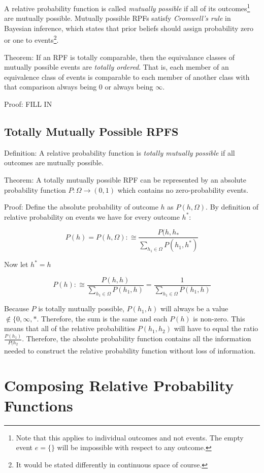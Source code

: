 \documentclass[twoside]{article}
\theoremstyle{plain}%
\theoremstyle{definition}
\theoremstyle{remark}
\begin{document}
A relative probability function is called \textit{mutually possible} if all of its outcomes\footnote{Note that this applies to individual outcomes and not events. The empty event \(e = \{\}\) will be impossible with respect to any outcome.} are mutually possible. Mutually possible RPFs satisfy \textit{Cromwell's rule} in Bayesian inference, which states that prior beliefs should assign probability zero or one to events\footnote{It would be stated differently in continuous space of course.}.

Theorem: If an RPF is totally comparable, then the equivalance classes of mutually possible events are \textit{totally ordered}. That is, each member of an equivalence class of events is comparable to each member of another class with that comparison always being 0 or always being \(\infty\).

Proof: FILL IN

\subsection{Totally Mutually Possible RPFS}

Definition: A relative probability function is \textit{totally mutually possible} if all outcomes are mutually possible.

Theorem: A totally mutually possible RPF can be represented by an absolute probability function \(P: \Omega \rightarrow (0, 1)\) which contains no zero-probability events.

Proof: Define the absolute probability of outcome \(h\) as \(P(h, \Omega)\). By definition of relative probability on events we have for every outcome \(h^*\):

\[P(h)=P(h, \Omega):\cong \frac{P(h, h_*}{\sum_{h_1 \in \Omega} P(h_1, h^*)}\]

Now let \(h^* = h\)

\[P(h):\cong \frac{P(h, h)}{\sum_{h_1 \in \Omega} P(h_1, h)}=\frac{1}{\sum_{h_1 \in \Omega} P(h_1, h)}\]

Because \(P\) is totally mutually possible, \(P(h_1, h)\) will always be a value \(\notin \{0, \infty, \ast\). Therefore, the sum is the same and each \(P(h)\) is non-zero. This means that all of the relative probabilities \(P(h_1, h_2)\) will have to equal the ratio \(\frac{P(h_1)}{P(h_2}\). Therefore, the absolute probability function contains all the information needed to construct the relative probability function without loss of information.

\section{Composing Relative Probability Functions}
\end{document}

